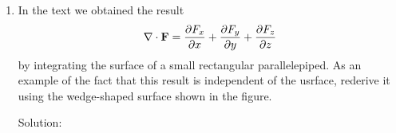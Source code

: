 \documentclass{article}
\begin{document}
\begin{enumerate}
    (b) Calculate the divergence of
    \[ \bb{G}(x,y,z) = \vvec{f(y,z)}{g(x,z)}{h(x,y)}\]

    Solution:

    \[ \nabla \cdot \bb{F} = \pd[F_x]{x} + \pd[F_y]{y} + \pd[F_z]{z}\]
    \[\pd[F_x]{x} = \pd[f(y,z)]{x} = 0 \]
    \[\pd[F_y]{y} = \pd[g(x,z)]{y} = 0 \]
    \[\pd[F_z]{z} = \pd[h(x,y)]{z} = 0 \]
    \[ \implies \nabla \cdot \bb{F} = 0 \]

    \item In the text we obtained the result
    \[ \nabla \cdot \bb{F} = \pd[F_x]{x} + \pd[F_y]{y} + \pd[F_z]{z}\]
    by integrating the surface of a small rectangular parallelepiped.
    As an example of the fact that this result is independent of the usrface, rederive it
    using the wedge-shaped surface shown in the figure.

    Solution:


\end{enumerate}
\end{document}
